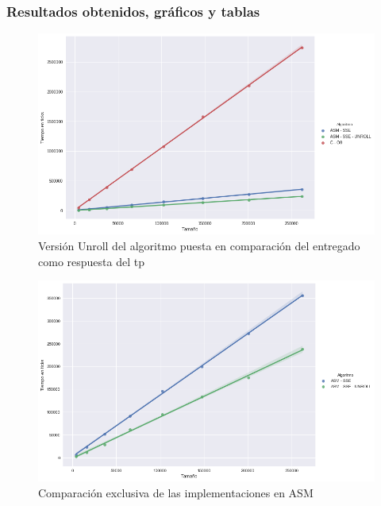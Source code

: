 \subsubsection*{Resultados obtenidos, gráficos y tablas}
\begin{figure}[H]
\centering
\includegraphics[scale=0.5]{img/fourCombine_UnrollvsNormal.png}
\caption{Versión Unroll del algoritmo puesta en comparación del entregado como respuesta del tp}
\label{sec:unroolvsnormal}
\end{figure}

\begin{figure}[H]
\centering
\includegraphics[scale=0.5]{img/fourCombine_UnrollvsNormal_asmOnly.png}
\caption{Comparación exclusiva de las implementaciones en ASM}
\label{sec:unroolvsnormal_asmOnly}
\end{figure}

